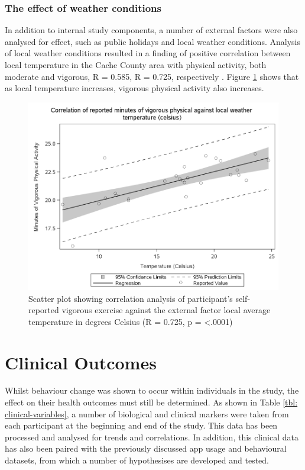 \subsubsection{The effect of weather conditions}
In addition to internal study components, a number of external factors were also analysed for effect, such as public holidays and local weather conditions.
Analysis of local weather conditions resulted in a finding of positive correlation between local temperature in the Cache County area with physical activity, both moderate and vigorous, R = 0.585, R = 0.725, respectively \cite{Hartin2015-ICOST}. Figure \ref{fig: scatter-regression-temp-activity} shows that as local temperature increases, vigorous physical activity also increases.

\begin{figure}[h]
    \centering
    \includegraphics[scale=0.4, angle=0]{Files/prevention-study-3/figures/correlation-temp-activity}
    \caption{Scatter plot showing correlation analysis of participant’s self-reported vigorous exercise against the external factor local average temperature in degrees Celsius (R = 0.725, p = \textless.0001)}
    \label{fig: scatter-regression-temp-activity}
\end{figure}


\section{Clinical Outcomes}
Whilst behaviour change was shown to occur within individuals in the study, the effect on their health outcomes must still be determined. As shown in Table \ref{tbl: clinical-variables}, a number of biological and clinical markers were taken from each participant at the beginning and end of the study. This data has been processed and analysed for trends and correlations. In addition, this clinical data has also been paired with the previously discussed app usage and behavioural datasets, from which a number of hypothesises are developed and tested.

